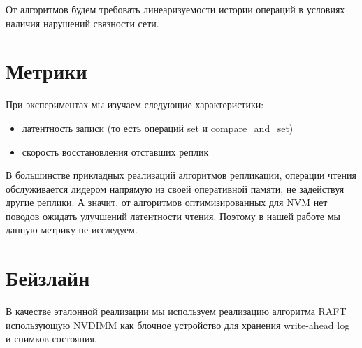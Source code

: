 \documentclass[pdftex,ptm,12pt,a4paper]{report}
\theoremstyle{definition}
\begin{document}
От алгоритмов будем требовать линеаризуемости \cite{linearizability} истории операций в условиях наличия нарушений связности сети.

\section{Метрики}
При экспериментах мы изучаем следующие характеристики:
\begin{itemize}
    \item латентность записи (то есть операций set и compare\_and\_set)
    \item скорость восстановления отставших реплик
\end{itemize}

В большинстве прикладных реализаций алгоритмов репликации, операции чтения обслуживается лидером напрямую из своей оперативной памяти, не задействуя другие реплики.
А значит, от алгоритмов оптимизированных для NVM нет поводов ожидать улучшений латентности чтения. Поэтому в нашей работе  мы данную метрику не исследуем.

\section{Бейзлайн}
В качестве эталонной реализации мы используем реализацию алгоритма RAFT \cite{raftpaper} использующую NVDIMM как блочное устройство
для хранения write-ahead log и снимков состояния.
\end{document}
